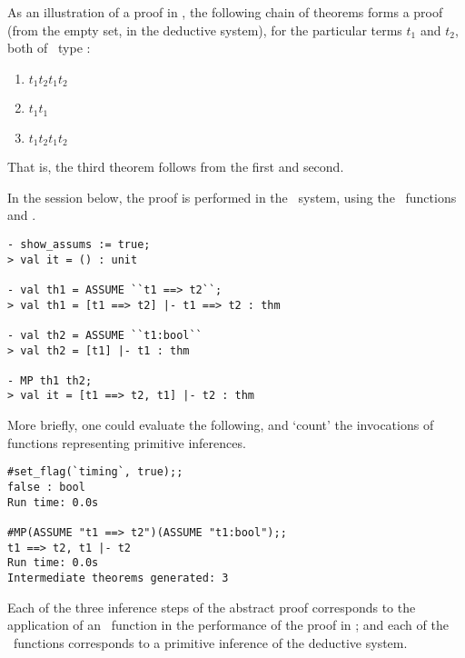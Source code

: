 As an illustration of a proof in \HOL{}, the following chain of
theorems forms a proof (from the empty set, in the \HOL{} deductive
system), for the particular terms $t_1$%
and $t_2$,%
both of \HOL\ type :%

\begin{enumerate}
\item $t_1$\ml{ ==> }$t_2$\ml{ |- }$t_1$\ml{ ==> }$t_2$

\item $t_1$\ml{ |- }$t_1$

\item $t_1$\ml{ ==> }$t_2$\ml{, }$t_1$\ml{ |- }$t_2$
\end{enumerate}

\noindent That is, the third theorem follows from the first and second.

In the session below, the proof is performed in the \HOL\ system,
using the \ML\ functions  and
.

\setcounter{sessioncount}{1}
\begin{session}
\begin{verbatim}
- show_assums := true;
> val it = () : unit

- val th1 = ASSUME ``t1 ==> t2``;
> val th1 = [t1 ==> t2] |- t1 ==> t2 : thm

- val th2 = ASSUME ``t1:bool``
> val th2 = [t1] |- t1 : thm

- MP th1 th2;
> val it = [t1 ==> t2, t1] |- t2 : thm
\end{verbatim}
\end{session}

\noindent More briefly, one could evaluate the following, and `count' the
invocations of functions representing primitive inferences.

\begin{session}
\begin{verbatim}
#set_flag(`timing`, true);;
false : bool
Run time: 0.0s

#MP(ASSUME "t1 ==> t2")(ASSUME "t1:bool");;
t1 ==> t2, t1 |- t2
Run time: 0.0s
Intermediate theorems generated: 3
\end{verbatim}
\end{session}

\noindent Each of the three inference steps of the abstract proof
corresponds to the application%
%
%
%
%
%
of an \ML\ function in the performance of the proof in \HOL; and each
of the \ML\ functions corresponds to a primitive inference of the
deductive system.

